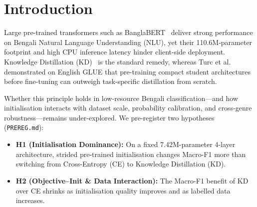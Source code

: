 \documentclass[conference]{IEEEtran}
\begin{document}
\section{Introduction}
Large pre-trained transformers such as BanglaBERT~\cite{bhattacharjee2022banglabert} deliver strong performance on Bengali Natural Language Understanding (NLU), yet their 110.6M-parameter footprint and high CPU inference latency hinder client-side deployment. Knowledge Distillation (KD)~\cite{hinton2015distilling,sanh2019distilbert,jiao2020tinybert,wang2020minilm} is the standard remedy, whereas Turc et al.~\cite{turc2019wellread} demonstrated on English GLUE that pre-training compact student architectures before fine-tuning can outweigh task-specific distillation from scratch.

Whether this principle holds in low-resource Bengali classification---and how initialisation interacts with dataset scale, probability calibration, and cross-genre robustness---remains under-explored. We pre-register two hypotheses (\texttt{PREREG.md}):
\begin{itemize}
    \item \textbf{H1 (Initialisation Dominance):} On a fixed 7.42M-parameter 4-layer architecture, strided pre-trained initialisation changes Macro-F1 more than switching from Cross-Entropy (CE) to Knowledge Distillation (KD).
    \item \textbf{H2 (Objective--Init \& Data Interaction):} The Macro-F1 benefit of KD over CE shrinks as initialisation quality improves and as labelled data increases.
\end{itemize}
\end{document}
